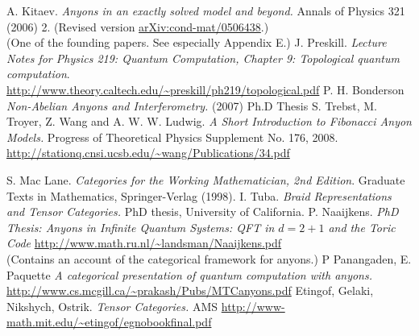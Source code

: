 \documentclass[a4paper,10pt,oneside]{book}
\theoremstyle{plain}
\theoremstyle{definition}
\theoremstyle{remark}
\begin{document}
\begin{thebibliography}{99}
   A. Kitaev. \textit{Anyons in an exactly solved model and beyond.} Annals of Physics 321 (2006) 2. (Revised version \href{https://arxiv.org/abs/cond-mat/0506438}{arXiv:cond-mat/0506438}.) \\\relax (One of the founding papers. See especially Appendix E.)
   J. Preskill. \textit{Lecture Notes for Physics 219: Quantum Computation, Chapter 9: Topological quantum computation}. \\ \url{http://www.theory.caltech.edu/~preskill/ph219/topological.pdf}
   P. H. Bonderson \textit{Non-Abelian Anyons and Interferometry.} (2007) Ph.D Thesis
   S. Trebst, M. Troyer, Z. Wang and A. W. W. Ludwig. \textit{A Short Introduction to Fibonacci Anyon Models.} Progress of Theoretical Physics Supplement No. 176, 2008. \\ \url{http://stationq.cnsi.ucsb.edu/~wang/Publications/34.pdf}

   S. Mac Lane. \textit{Categories for the Working Mathematician, 2nd Edition}. Graduate Texts in Mathematics, Springer-Verlag (1998).
   I. Tuba. \textit{Braid Representations and Tensor Categories.} PhD thesis, University of California.
   P. Naaijkens. \textit{PhD Thesis: Anyons in Infinite Quantum Systems: QFT in $d=2+1$ and the Toric Code} \url{http://www.math.ru.nl/~landsman/Naaijkens.pdf} \\\relax (Contains an account of the categorical framework for anyons.)
   P Panangaden, E. Paquette \textit{A categorical presentation of quantum computation with anyons.} \\ \url{http://www.cs.mcgill.ca/~prakash/Pubs/MTCanyons.pdf}
   Etingof, Gelaki, Nikshych, Ostrik. \textit{Tensor Categories.} AMS \url{http://www-math.mit.edu/~etingof/egnobookfinal.pdf}


\end{thebibliography}
\end{document}
